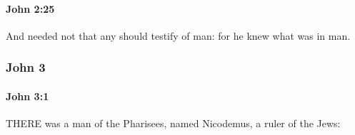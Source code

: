 		\paragraph{John 2:25} %
			\label{JOHN-2-25}

			And needed not that any should testify of man: for he knew what was in man.

			\begin{framed}
			\scriptsize
				\begin{compactdesc}
					\item[SBLG] 
				\end{compactdesc}
			\end{framed}

	\subsubsection{John 3} %
		\label{JOHN-3}
		
		\paragraph{John 3:1} %
			\label{JOHN-3-1}

			THERE was a man of the Pharisees, named Nicodemus, a ruler of the Jews:

